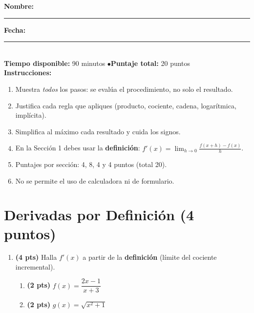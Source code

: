 \documentclass[12pt, letterpaper]{article}
\begin{document}


\vspace{4pt}
\begin{cuadroinfo}
  \small
  \textbf{Nombre:} \rule{0.55\linewidth}{0.4pt} \quad \textbf{Fecha:} \rule{0.15\linewidth}{0.4pt} \\[6pt]
  \textbf{Tiempo disponible:} 90 minutos \quad$\bullet$\quad \textbf{Puntaje total:} 20 puntos \\[4pt]
  \textbf{Instrucciones:}
  \begin{enumerate}[leftmargin=*]
    \item Muestra \emph{todos} los pasos: se evalúa el procedimiento, no solo el resultado.
    \item Justifica cada regla que apliques (producto, cociente, cadena, logarítmica, implícita).
    \item Simplifica al máximo cada resultado y cuida los signos.
    \item En la Sección 1 debes usar la \textbf{definición}: $\displaystyle f'(x)=\lim_{h\to 0}\frac{f(x+h)-f(x)}{h}$.
    \item Puntajes por sección: 4, 8, 4 y 4 puntos (total 20).
    \item No se permite el uso de calculadora ni de formulario.
  \end{enumerate}
\end{cuadroinfo}

\vspace{8pt}

\section{Derivadas por Definición (4 puntos)}

\begin{enumerate}[leftmargin=*]
  \item \textbf{(4 pts)} Halla $f'(x)$ a partir de la \textbf{definición} (límite del cociente incremental).
        \begin{enumerate}[label=\alph*)]
          \item \textbf{(2 pts)} $f(x) = \dfrac{2x-1}{x+3}$
          \item \textbf{(2 pts)} $g(x) = \sqrt{x^{2}+1}$
        \end{enumerate}
\end{enumerate}
\end{document}
